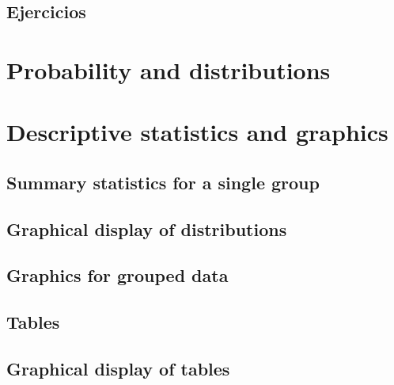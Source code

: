 \documentclass[spanish]{extbook}
\numberwithin{equation}{section}
\numberwithin{figure}{section}
\begin{document}
\section{Ejercicios}

\chapter{Probability and distributions}

\chapter{Descriptive statistics and graphics}
\section{Summary statistics for a single group}
\section{Graphical display of distributions}
\section{Graphics for grouped data}
\section{Tables} \label{tables}
\section{Graphical display of tables}
\end{document}
